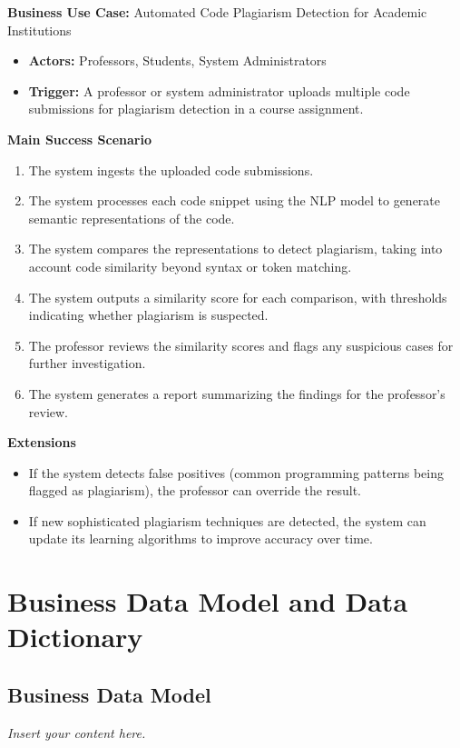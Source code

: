 \documentclass[12pt]{article}
\newcommand{\lips}{\textit{Insert your content here.}}
\begin{document}
\textbf{Business Use Case:} Automated Code Plagiarism Detection for Academic Institutions

\begin{itemize}
    \item \textbf{Actors:} Professors, Students, System Administrators
    \item \textbf{Trigger:} A professor or system administrator uploads multiple code submissions for plagiarism detection in a course assignment.
\end{itemize}

\textbf{Main Success Scenario}
\begin{enumerate}
    \item The system ingests the uploaded code submissions.
    \item The system processes each code snippet using the NLP model to generate semantic representations of the code.
    \item The system compares the representations to detect plagiarism, taking into account code similarity beyond syntax or token matching.
    \item The system outputs a similarity score for each comparison, with thresholds indicating whether plagiarism is suspected.
    \item The professor reviews the similarity scores and flags any suspicious cases for further investigation.
    \item The system generates a report summarizing the findings for the professor’s review.
\end{enumerate}

\textbf{Extensions}
\begin{itemize}
    \item If the system detects false positives (common programming patterns being flagged as plagiarism), the professor can override the result.
    \item If new sophisticated plagiarism techniques are detected, the system can update its learning algorithms to improve accuracy over time.
\end{itemize}

\section{Business Data Model and Data Dictionary}
\subsection{Business Data Model}
\lips
\end{document}
